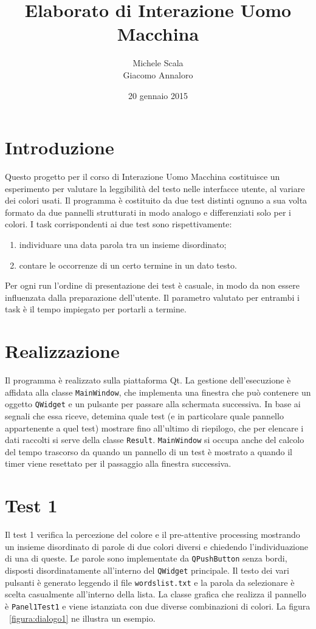 \documentclass[a4paper]{article}
\begin{document}
\title{Elaborato di Interazione Uomo Macchina}
\author{Michele Scala \\ Giacomo Annaloro}
\date{20 gennaio 2015}
\maketitle


\section{Introduzione}
Questo progetto per il corso di Interazione Uomo Macchina costituisce un esperimento per valutare la leggibilità del testo nelle interfacce utente, al variare dei colori usati. Il programma è costituito da due test distinti ognuno a sua volta formato da due pannelli strutturati in modo analogo e differenziati solo per i colori.
I task corrispondenti ai due test sono rispettivamente:
\begin{enumerate}
\item individuare una data parola tra un insieme disordinato;
\item contare le occorrenze di un certo termine in un dato testo.
\end{enumerate}
Per ogni run l'ordine di presentazione dei test è casuale, in modo da non essere influenzata dalla preparazione dell'utente. 
Il parametro valutato per entrambi i task è il tempo impiegato per portarli a termine.

\section{Realizzazione}
Il programma è realizzato sulla piattaforma Qt. 
La gestione dell'esecuzione è affidata alla classe \verb:MainWindow:, che implementa una finestra che può contenere un oggetto \verb:QWidget: e un pulsante per passare alla schermata successiva. In base ai segnali che essa riceve, detemina quale test (e in particolare quale pannello appartenente a quel test) mostrare fino all'ultimo di riepilogo, che per elencare i dati raccolti si serve della classe \verb:Result:.
\verb:MainWindow: si occupa anche del calcolo del tempo trascorso da quando un pannello di un test è mostrato a quando il timer viene resettato per il passaggio alla finestra successiva.

\pagebreak

\section{Test 1}
Il test 1 verifica la percezione del colore e il pre-attentive processing mostrando un insieme disordinato di parole di due colori diversi e chiedendo l'individuazione di una di queste.
Le parole sono implementate da \verb:QPushButton: senza bordi, disposti disordinatamente all'interno del \verb:QWidget: principale. Il testo dei vari pulsanti è generato leggendo il file \verb:wordslist.txt: e la parola da selezionare è scelta casualmente all'interno della lista.
La classe grafica che realizza il pannello è \verb:Panel1Test1: e viene istanziata con due diverse combinazioni di colori.
La figura ~\ref{figura:dialogo1} ne illustra un esempio.
\end{document}
